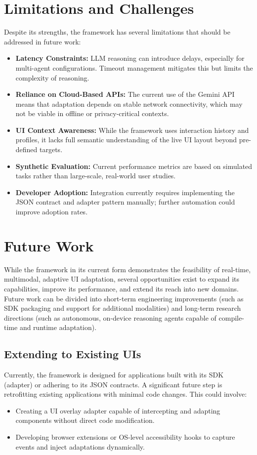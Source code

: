 \documentclass[openany]{book}
\begin{document}
\section{Limitations and Challenges}
Despite its strengths, the framework has several limitations that should be addressed in future work:
\begin{itemize}
    \item \textbf{Latency Constraints:} LLM reasoning can introduce delays, especially for multi-agent configurations. Timeout management mitigates this but limits the complexity of reasoning.
    \item \textbf{Reliance on Cloud-Based APIs:} The current use of the Gemini API means that adaptation depends on stable network connectivity, which may not be viable in offline or privacy-critical contexts.
    \item \textbf{UI Context Awareness:} While the framework uses interaction history and profiles, it lacks full semantic understanding of the live UI layout beyond pre-defined targets.
    \item \textbf{Synthetic Evaluation:} Current performance metrics are based on simulated tasks rather than large-scale, real-world user studies.
    \item \textbf{Developer Adoption:} Integration currently requires implementing the JSON contract and adapter pattern manually; further automation could improve adoption rates.
\end{itemize}

\section{Future Work} 
While the framework in its current form demonstrates the feasibility of real-time, multimodal, adaptive UI adaptation, several opportunities exist to expand its capabilities, improve its performance, and extend its reach into new domains. Future work can be divided into short-term engineering improvements (such as SDK packaging and support for additional modalities) and long-term research directions (such as autonomous, on-device reasoning agents capable of compile-time and runtime adaptation).

\subsection{Extending to Existing UIs}
Currently, the framework is designed for applications built with its SDK (adapter) or adhering to its JSON contracts. A significant future step is retrofitting existing applications with minimal code changes. This could involve:
\begin{itemize}
    \item Creating a UI overlay adapter capable of intercepting and adapting components without direct code modification.
    \item Developing browser extensions or OS-level accessibility hooks to capture events and inject adaptations dynamically.
\end{itemize}
\end{document}

